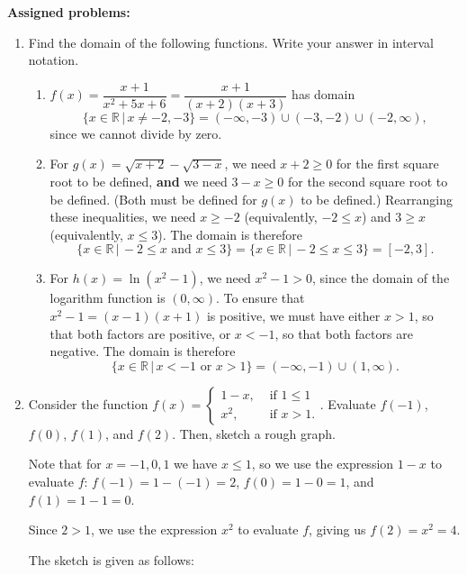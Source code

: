 \documentclass[12pt]{article}
\newcommand{\R}{\mathbb{R}}
\begin{document}
\textbf{Assigned problems:}

\begin{enumerate}
\item Find the domain of the following functions. Write your answer in interval notation.
  \begin{enumerate}
  \item $f(x) = \dfrac{x+1}{x^2+5x+6} = \dfrac{x+1}{(x+2)(x+3)}$ has domain 
  \[
  \{x\in\R\,|\, x\neq -2,-3\} = (-\infty,-3)\cup(-3,-2)\cup(-2,\infty),
  \]
  since we cannot divide by zero.
  \item For $g(x) = \sqrt{x+2}-\sqrt{3-x}$, we need $x+2\geq 0$ for the first square root to be defined, \textbf{and} we need $3-x\geq 0$ for the second square root to be defined. (Both must be defined for $g(x)$ to be defined.) Rearranging these inequalities, we need $x\geq -2$ (equivalently, $-2\leq x$) and $3\geq x$ (equivalently, $x\leq 3$). The domain is therefore
  \[
  \{x\in\R\,|\, -2\leq x \text{ and } x\leq 3\} = \{x\in\R\,|\, -2\leq x\leq 3\} = [-2,3].
  \]
  \item For $h(x) = \ln(x^2-1)$, we need $x^2-1 >0$, since the domain of the logarithm function is $(0,\infty)$. To ensure that $x^2-1=(x-1)(x+1)$ is positive, we must have either $x>1$, so that both factors are positive, or $x<-1$, so that both factors are negative. The domain is therefore
  \[
  \{x\in\R\,|\, x<-1 \text{ or } x>1\} = (-\infty,-1)\cup (1,\infty).
  \]
  \end{enumerate}
  
  \item Consider the function $f(x) = \begin{cases}1-x, & \text{ if } 1\leq 1\\ x^2, & \text{ if } x>1.\end{cases}$. Evaluate $f(-1)$, $f(0)$, $f(1)$, and $f(2)$. Then, sketch a rough graph.
  
  \bigskip
 
 \begin{multicols}{2} 
  Note that for $x=-1, 0, 1$ we have $x\leq 1$, so we use the expression $1-x$ to evaluate $f$: $f(-1) = 1-(-1)=2$, $f(0) = 1-0 = 1$,  and  $f(1) = 1-1 = 0$.
  
  Since $2>1$, we use the expression $x^2$ to evaluate $f$, giving us $f(2)=x^2=4$.
  
  
  
  The sketch is given as follows:
  

\end{multicols}
\end{enumerate}
\end{document}
